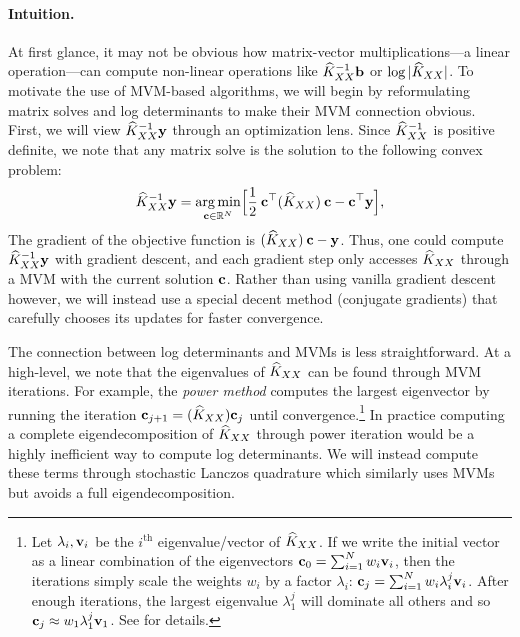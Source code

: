 \paragraph{Intuition.}
At first glance, it may not be obvious how matrix-vector multiplications---a linear operation---can compute non-linear operations like $\widehat{K}_{XX}^{-1} \mathbf{b}$ or $\log \vert \widehat{K}_{XX} \vert$.
To motivate the use of MVM-based algorithms, we will begin by reformulating matrix solves and log determinants to make their MVM connection obvious.
First, we will view $\widehat{K}_{XX}^{-1} \mathbf{y}$ through an optimization lens.
Since $\widehat{K}_{XX}^{-1}$ is positive definite, we note that any matrix solve is the solution to the following convex problem:
%
\begin{equation}
  \widehat{K}_{XX}^{-1} \mathbf{y} = \operatorname*{arg\,min}_{\mathbf{c} \in \mathbb{R}^{N}} \Bigl[ \frac{1}{2} \: \mathbf{c}^\top (\widehat{K}_{XX}) \: \mathbf{c} - \mathbf{c}^\top \mathbf{y} \Bigr],
  \label{eqn:solve_as_optim}
\end{equation}
%
The gradient of the objective function is $(\widehat{K}_{XX}) \: \mathbf{c} - \mathbf{y}$.
Thus, one could compute $\widehat{K}_{XX}^{-1} \mathbf{y}$ with gradient descent, and each gradient step only accesses $\widehat{K}_{XX}$ through a MVM with the current solution $\mathbf{c}$.
Rather than using vanilla gradient descent however, we will instead use a special decent method (conjugate gradients) that carefully chooses its updates for faster convergence.

The connection between log determinants and MVMs is less straightforward.
At a high-level, we note that the eigenvalues of $\widehat{K}_{XX}$ can be found through MVM iterations.
For example, the \emph{power method} computes the largest eigenvector by running the iteration $\mathbf{c}_{j+1} = (\widehat{K}_{XX}) \mathbf{c}_{j}$ until convergence.\footnote{
  Let $\lambda_i, \mathbf{v}_i$ be the $i^\text{th}$ eigenvalue/vector of $\widehat{K}_{XX}$.
  If we write the initial vector as a linear combination of the eigenvectors $\mathbf{c}_{0} = \sum_{i=1}^N w_i \mathbf{v}_i$, then the iterations simply scale the weights $w_i$ by a factor $\lambda_i$:
  $\mathbf{c}_{j} = \sum_{i=1}^N w_i \lambda_i^j \mathbf{v}_i$.
  After enough iterations, the largest eigenvalue $\lambda_1^j$ will dominate all others and so $\mathbf{c}_j \approx w_1 \lambda_1^j \mathbf{v}_1$.
  See \citep[e.g.][Ch. 8]{golub2012matrix} for details.
}
In practice computing a complete eigendecomposition of $\widehat{K}_{XX}$ through power iteration would be a highly inefficient way to compute log determinants.
We will instead compute these terms through stochastic Lanczos quadrature \citep{ubaru2017fast} which similarly uses MVMs but avoids a full eigendecomposition.

